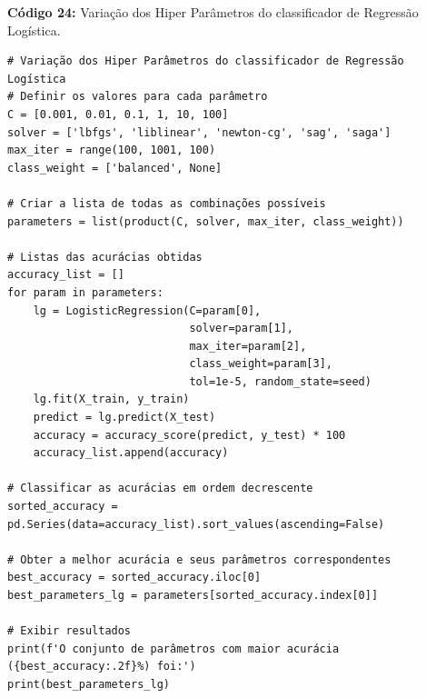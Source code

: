 \documentclass[a4paper,12pt]{article} %
\begin{document}
\begin{center}
\textbf{Código 24:} Variação dos Hiper Parâmetros do classificador de Regressão Logística.
\begin{verbatim}
# Variação dos Hiper Parâmetros do classificador de Regressão Logística
# Definir os valores para cada parâmetro
C = [0.001, 0.01, 0.1, 1, 10, 100]
solver = ['lbfgs', 'liblinear', 'newton-cg', 'sag', 'saga']
max_iter = range(100, 1001, 100)
class_weight = ['balanced', None]

# Criar a lista de todas as combinações possíveis
parameters = list(product(C, solver, max_iter, class_weight))

# Listas das acurácias obtidas
accuracy_list = []
for param in parameters:
    lg = LogisticRegression(C=param[0],
                            solver=param[1],
                            max_iter=param[2],
                            class_weight=param[3],
                            tol=1e-5, random_state=seed)
    lg.fit(X_train, y_train)
    predict = lg.predict(X_test)
    accuracy = accuracy_score(predict, y_test) * 100
    accuracy_list.append(accuracy)

# Classificar as acurácias em ordem decrescente
sorted_accuracy = pd.Series(data=accuracy_list).sort_values(ascending=False)

# Obter a melhor acurácia e seus parâmetros correspondentes
best_accuracy = sorted_accuracy.iloc[0]
best_parameters_lg = parameters[sorted_accuracy.index[0]]

# Exibir resultados
print(f'O conjunto de parâmetros com maior acurácia ({best_accuracy:.2f}%) foi:')
print(best_parameters_lg)
\end{verbatim}
\end{center}
\end{document}
